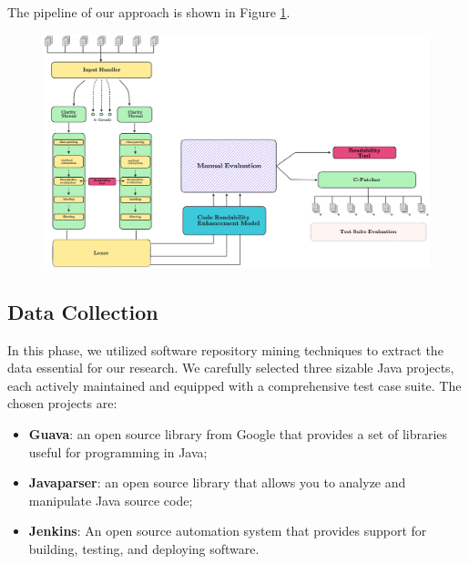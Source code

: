 The pipeline of our approach is shown in Figure \ref{fig:pipeline}.
\begin{figure}[htbp]
	\centering
	\includegraphics[width=1\textwidth,height=1\textheight,keepaspectratio]{figs/pipeline.png}
	\caption{}\label{fig:pipeline}
\end{figure}


\subsection{Data Collection}
In this phase, we utilized software repository mining techniques to extract the data essential for our research. We carefully selected three sizable Java projects, each actively maintained and equipped with a comprehensive test case suite. The chosen projects are:

\begin{itemize}
	\item \textbf{Guava}: an open source library from Google that provides a set of libraries useful for programming in Java;
	\item \textbf{Javaparser}: an open source library that allows you to analyze and manipulate Java source code;
	\item \textbf{Jenkins}: An open source automation system that provides support for building, testing, and deploying software.
\end{itemize}

